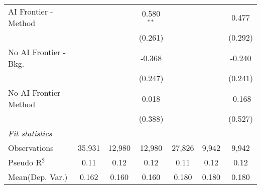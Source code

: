 \begin{tabular}{lcccccc}
   AI Frontier - Method    &                &                & 0.580$^{**}$  &                &               & 0.477\\   
                           &                &                & (0.261)       &                &               & (0.292)\\   
   No AI Frontier - Bkg.   &                &                & -0.368        &                &               & -0.240\\   
                           &                &                & (0.247)       &                &               & (0.241)\\   
   No AI Frontier - Method &                &                & 0.018         &                &               & -0.168\\   
                           &                &                & (0.388)       &                &               & (0.527)\\   
   \midrule
   \emph{Fit statistics}\\
   Observations            & 35,931         & 12,980         & 12,980        & 27,826         & 9,942         & 9,942\\  
   Pseudo R$^2$            & 0.11           & 0.12           & 0.12          & 0.11           & 0.12          & 0.12\\  
Mean(Dep. Var.) & 0.162 & 0.160 & 0.160 & 0.180 & 0.180 & 0.180 \\
   

\end{tabular}
